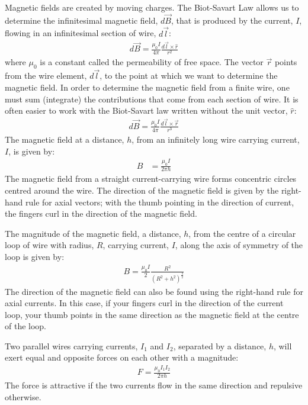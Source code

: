 \begin{chapterSummary}
Magnetic fields are created by moving charges. The Biot-Savart Law allows us to determine the infinitesimal magnetic field, $d\vec B$, that is produced by the current, $I$, flowing in an infinitesimal section of wire, $d\vec l$:
\begin{align*}
d\vec B = \frac{\mu_0 I}{4\pi}\frac{d\vec l\times \hat r}{r^2}
\end{align*}
where $\mu_0$ is a constant called the permeability of free space. The vector $\vec r$ points from the wire element, $d\vec l$, to the point at which we want to determine the magnetic field. In order to determine the magnetic field from a finite wire, one must sum (integrate) the contributions that come from each section of wire. It is often easier to work with the Biot-Savart law written without the unit vector, $\hat r$:
\begin{align*}
d\vec B = \frac{\mu_0 I}{4\pi}\frac{d\vec l\times \vec r}{r^3}
\end{align*}
The magnetic field at a distance, $h$, from an infinitely long wire carrying current, $I$, is given by:
\begin{align*}
B&=\frac{\mu_0 I}{2\pi h}
\end{align*}
The magnetic field from a straight current-carrying wire forms concentric circles centred around the wire. The direction of the magnetic field is given by the right-hand rule for axial vectors; with the thumb pointing in the direction of current, the fingers curl in the direction of the magnetic field. 

The magnitude of the magnetic field, a distance, $h$, from the centre of a circular loop of wire with radius, $R$, carrying current, $I$, along the axis of symmetry of the loop is given by:
\begin{align*}
B=\frac{\mu_0 I}{2} \frac{R^2}{(R^2+h^2)^\frac{3}{2}}
\end{align*}
The direction of the magnetic field can also be found using the right-hand rule for axial currents. In this case, if your fingers curl in the direction of the current loop, your thumb points in the same direction as the magnetic field at the centre of the loop.

Two parallel wires carrying currents, $I_1$ and $I_2$, separated by a distance, $h$, will exert equal and opposite forces on each other with a magnitude:
\begin{align*}
F = \frac{\mu_0I_1I_2}{2\pi h}
\end{align*}
The force is attractive if the two currents flow in the same direction and repulsive otherwise.


\end{chapterSummary}
